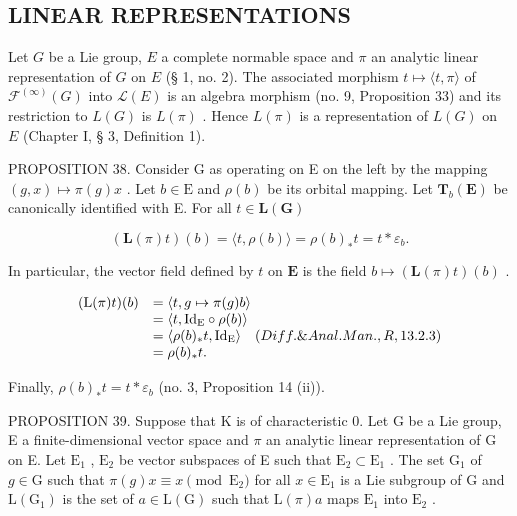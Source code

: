 \subsection{LINEAR REPRESENTATIONS}

Let \(G\) be a Lie group, \(E\) a complete normable space and \(\pi\) an analytic linear representation of \(G\) on \(E\) (§ 1, no. 2). The associated morphism \(t \mapsto \langle t, \pi \rangle\) of \(\mathcal{F}^{(\infty)}(G)\) into \(\mathcal{L}(E)\) is an algebra morphism (no. 9, Proposition 33) and its restriction to \(L(G)\) is \(L(\pi)\) . Hence \(L(\pi)\) is a representation of \(L(G)\) on \(E\) (Chapter I, § 3, Definition 1).

PROPOSITION 38. Consider G as operating on E on the left by the mapping \((g,x)\mapsto \pi (g)x\) . Let \(b\in \mathrm{E}\) and \(\rho (b)\) be its orbital mapping. Let \(\mathbf{T}_b(\mathbf{E})\) be canonically identified with E. For all \(t\in \mathbf{L}(\mathbf{G})\)

\[
(\mathbf {L} (\pi) t) (b) = \langle t, \rho (b) \rangle = \rho (b) _ {*} t = t * \varepsilon_ {b}.
\]

In particular, the vector field defined by \(t\) on \(\mathbf{E}\) is the field \(b \mapsto (\mathbf{L}(\pi)t)(b)\) .

\[
\begin{array}{r l} (\mathrm{L} (\pi) t) (b) & = \langle t, g \mapsto \pi (g) b \rangle \\ & = \langle t, \mathrm{Id} _ {\mathrm{E}} \circ \rho (b) \rangle \\ & = \langle \rho (b) _ {*} t, \mathrm{Id} _ {\mathrm{E}} \rangle \quad (Diff. \& Anal. Man., R, 13.2.3) \\ & = \rho (b) _ {*} t. \end{array}
\]

Finally, \(\rho(b)_{*}t = t*\varepsilon_{b}\) (no. 3, Proposition 14 (ii)).

PROPOSITION 39. Suppose that K is of characteristic 0. Let G be a Lie group, E a finite-dimensional vector space and \(\pi\) an analytic linear representation of G on E. Let \(\mathrm{E}_1\) , \(\mathrm{E}_2\) be vector subspaces of E such that \(\mathrm{E}_2 \subset \mathrm{E}_1\) . The set \(\mathrm{G}_1\) of \(g \in \mathrm{G}\) such that \(\pi(g) x \equiv x \pmod{\mathrm{E}_2}\) for all \(x \in \mathrm{E}_1\) is a Lie subgroup of G and \(\mathrm{L}(\mathrm{G}_1)\) is the set of \(a \in \mathrm{L}(\mathrm{G})\) such that \(\mathrm{L}(\pi)a\) maps \(\mathrm{E}_1\) into \(\mathrm{E}_2\) .

